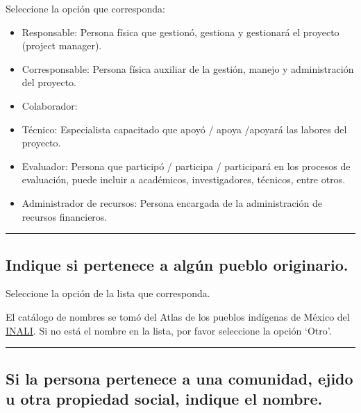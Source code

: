 \documentclass[
]{book}
\providecommand{\tightlist}{%
  \setlength{\itemsep}{0pt}\setlength{\parskip}{0pt}}
\begin{document}
Seleccione la opción que corresponda:

\begin{itemize}
\tightlist
\item
  Responsable: Persona física que gestionó, gestiona y gestionará el proyecto (project manager).
\item
  Corresponsable: Persona física auxiliar de la gestión, manejo y administración del proyecto.
\item
  Colaborador:
\item
  Técnico: Especialista capacitado que apoyó / apoya /apoyará las labores del proyecto.
\item
  Evaluador: Persona que participó / participa / participará en los procesos de evaluación, puede incluir a académicos, investigadores, técnicos, entre otros.
\item
  Administrador de recursos: Persona encargada de la administración de recursos financieros.
\end{itemize}

\begin{center}\rule{0.5\linewidth}{0.5pt}\end{center}

\hypertarget{indique-si-pertenece-a-alguxfan-pueblo-originario.}{%
\subsection*{Indique si pertenece a algún pueblo originario.}\label{indique-si-pertenece-a-alguxfan-pueblo-originario.}}

Seleccione la opción de la lista que corresponda.

El catálogo de nombres se tomó del Atlas de los pueblos indígenas de México del \href{http://atlas.inpi.gob.mx/pueblos-indigenas/}{INALI}. Si no está el nombre en la lista, por favor seleccione la opción `Otro'.

\begin{center}\rule{0.5\linewidth}{0.5pt}\end{center}

\hypertarget{si-la-persona-pertenece-a-una-comunidad-ejido-u-otra-propiedad-social-indique-el-nombre.}{%
\subsection*{Si la persona pertenece a una comunidad, ejido u otra propiedad social, indique el nombre.}\label{si-la-persona-pertenece-a-una-comunidad-ejido-u-otra-propiedad-social-indique-el-nombre.}}
\end{document}
